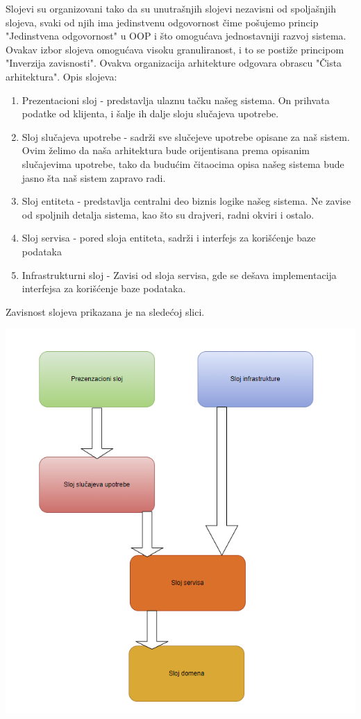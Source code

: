 \documentclass{article}
\begin{document}
Slojevi su organizovani tako da su unutrašnjih slojevi nezavisni od spoljašnjih slojeva, svaki od njih ima jedinstvenu odgovornost čime pošujemo princip "Jedinstvena odgovornost" u OOP i što omogućava jednostavniji razvoj sistema. Ovakav izbor slojeva omogućava visoku granuliranost, i to se postiže principom "Inverzija zavisnosti". Ovakva organizacija arhitekture odgovara obrascu "Čista arhitektura".
\newline
\newline
Opis slojeva:
\newline
\begin{enumerate}
    \item Prezentacioni sloj - predstavlja ulaznu tačku našeg sistema. On prihvata podatke od klijenta, i šalje ih dalje sloju slučajeva upotrebe.
    \item Sloj slučajeva upotrebe - sadrži sve slučejeve upotrebe opisane za naš sistem. Ovim želimo da naša arhitektura bude orijentisana prema opisanim slučajevima upotrebe, tako da budućim čitaocima opisa našeg sistema bude jasno šta naš sistem zapravo radi. 
    \item Sloj entiteta - predstavlja centralni deo biznis logike našeg sistema. Ne zavise od spoljnih detalja sistema, kao što su drajveri, radni okviri i ostalo.
    \item Sloj servisa - pored sloja entiteta, sadrži i interfejs za korišćenje baze podataka
    \item Infrastrukturni sloj - Zavisi od sloja servisa, gde se dešava implementacija interfejsa za korišćenje baze podataka.
\end{enumerate}



Zavisnost slojeva prikazana je na sledećoj slici.


\begin{center}
    \includegraphics[scale=0.5]{zavisnostSlojeva.png}
\end{center}
\end{document}
